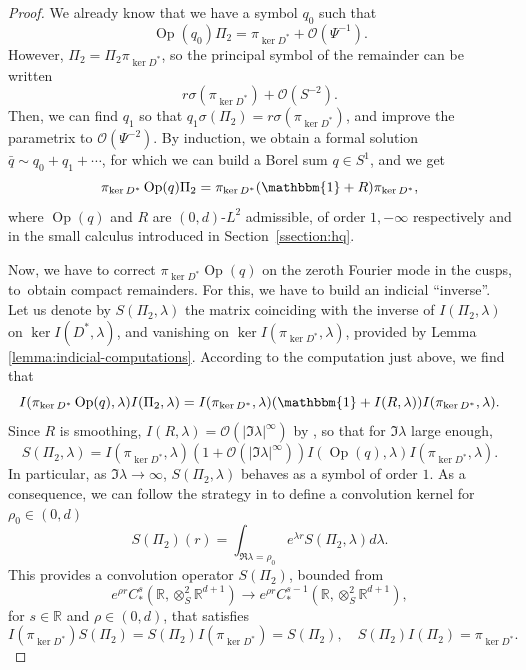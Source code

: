 \documentclass[JEP,XML,SOM,Unicode,NoFloatCountersInSection]{cedram}
\newcommand{\R}{\mathbb{R}}
\DeclareMathOperator{\Op}{Op}
\theoremstyle{plain}
\theoremstyle{definition}
\begin{document}
\begin{proof}
We already know that we have a symbol $q_0$ such that
\[
\Op(q_0)\Pi_2 = \pi_{\ker D^\ast} + \mathcal{O}(\Psi^{-1}).
\]
However, $\Pi_2 = \Pi_2 \pi_{\ker D^\ast}$, so the principal symbol of the remainder can be written
\[
r \sigma(\pi_{\ker D^\ast}) + \mathcal{O}(S^{-2}).
\]
Then, we can find $q_1$ so that $q_1 \sigma(\Pi_2) = r \sigma(\pi_{\ker D^\ast})$, and improve the parametrix to $\mathcal{O}(\Psi^{-2})$. By induction, we obtain a formal solution $\bar{q} \sim q_0 + q_1 + \cdots$, for which we can build a Borel sum $q \in S^1$, and we get
\[
\pi_{\ker D^\ast} \Op(q) \Pi_2 = \pi_{\ker D^\ast}(\mathbbm{1}+ R)\pi_{\ker D^\ast},
\]
where $\Op(q)$ and $R$ are $(0,d)$-$L^2$ admissible, of order $1,-\infty$ respectively and in the small calculus introduced in Section~\ref{ssection:hq}.

Now, we have to correct $\pi_{\ker D^\ast} \Op(q)$ on the zeroth Fourier mode in the cusps, to~obtain compact remainders. For this, we have to build an indicial ``inverse''. Let us denote by $S(\Pi_2,\lambda)$ the matrix coinciding with the inverse of $I(\Pi_2,\lambda)$ on $\ker I(D^\ast, \lambda)$, and vanishing on $\ker I(\pi_{\ker D^\ast},\lambda)$, provided by Lemma \ref{lemma:indicial-computations}. According to the computation just above, we find that
\[
I(\pi_{\ker D^\ast}\Op(q),\lambda)I(\Pi_2,\lambda) = I(\pi_{\ker D^\ast},\lambda)(\mathbbm{1}+I(R,\lambda)) I(\pi_{\ker D^\ast},\lambda).
\]
Since $R$ is smoothing, $I(R,\lambda) = \mathcal{O}(|\Im\lambda|^\infty)$ by \cite[Lem.\,4.7]{Bonthonneau-Lefeuvre-19-1}, so that for $\Im \lambda$ large enough,
\[
S(\Pi_2,\lambda) = I(\pi_{\ker D^\ast},\lambda)(1+\mathcal{O}(|\Im\lambda|^\infty)) I(\Op(q),\lambda) I(\pi_{\ker D^\ast}, \lambda).
\]
In particular, as $\Im \lambda\to \infty$, $S(\Pi_2,\lambda)$ behaves as a symbol of order $1$. As a consequence, we can follow the strategy in \cite[Prop.\,4.5]{Bonthonneau-Lefeuvre-19-1} to define a convolution kernel for $\rho_0\in (0,d)$
\[
S(\Pi_2)(r) = \int_{\Re \lambda = \rho_0} e^{\lambda r} S(\Pi_2,\lambda) d\lambda.
\]
This provides a convolution operator $S(\Pi_2)$, bounded from
\[
e^{\rho r} C^s_\ast(\R,\otimes^2_S \R^{d+1}) \to e^{\rho r} C^{s-1}_{\ast}(\R,\otimes^2_S \R^{d+1}),
\]
for $s\in\R$ and $\rho\in (0,d)$, that satisfies
\[
I(\pi_{\ker D^\ast} ) S(\Pi_2) = S(\Pi_2) I(\pi_{\ker D^\ast}) = S(\Pi_2),\quad S(\Pi_2)I(\Pi_2) = \pi_{\ker D^\ast}.
\]


\end{proof}
\end{document}
